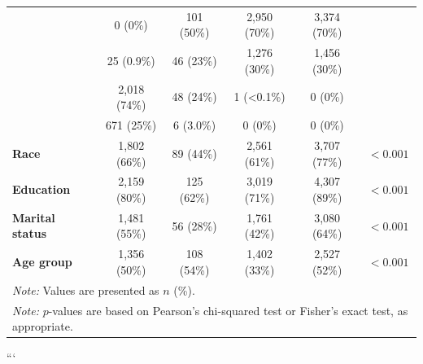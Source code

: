 \begin{table}[H]
\begin{tabular}{lccccc}
\quad 0 &
0 (0\%) &
101 (50\%) &
2,950 (70\%) &
3,374 (70\%) &
\\

\quad 1 &
25 (0.9\%) &
46 (23\%) &
1,276 (30\%) &
1,456 (30\%) &
\\

\quad 2 &
2,018 (74\%) &
48 (24\%) &
1 (<0.1\%) &
0 (0\%) &
\\

\quad 3 &
671 (25\%) &
6 (3.0\%) &
0 (0\%) &
0 (0\%) &
\\

\textbf{Race} &
1,802 (66\%) &
89 (44\%) &
2,561 (61\%) &
3,707 (77\%) &
$<0.001$ \\

\textbf{Education} &
2,159 (80\%) &
125 (62\%) &
3,019 (71\%) &
4,307 (89\%) &
$<0.001$ \\

\textbf{Marital status} &
1,481 (55\%) &
56 (28\%) &
1,761 (42\%) &
3,080 (64\%) &
$<0.001$ \\

\textbf{Age group} &
1,356 (50\%) &
108 (54\%) &
1,402 (33\%) &
2,527 (52\%) &
$<0.001$ \\

\hline
\multicolumn{6}{l}{\footnotesize \textit{Note:} Values are presented as $n$ (\%).} \\
\multicolumn{6}{l}{\footnotesize \textit{Note:} $p$-values are based on Pearson's chi-squared test or Fisher's exact test, as appropriate.}
\end{tabular}
\end{table}
```
